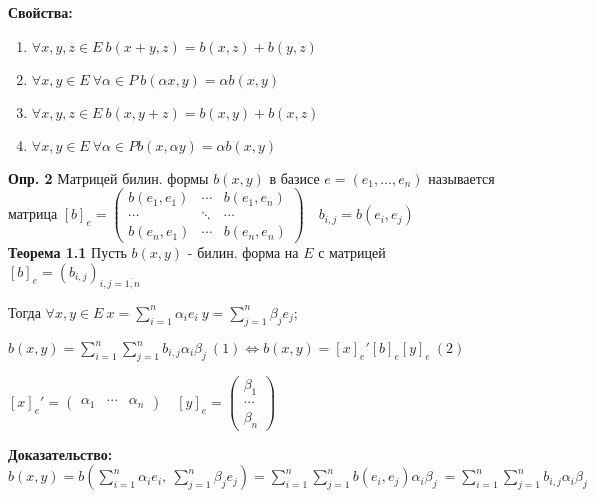 \textbf{Свойства:}
\begin{enumerate}
 \item $\forall x,y,z \in E\ b(x+y,z) = b(x,z) + b(y,z)$
 \item $\forall x,y \in E\ \forall \alpha \in P\ b(\alpha x,y) = \alpha b(x,y)$
 \item $\forall x,y,z \in E\ b(x,y+z) = b(x,y) + b(x,z)$
 \item $\forall x,y \in E\ \forall \alpha \in P b(x,\alpha y) = \alpha b(x,y)$
\end{enumerate}

\textbf{Опр. 2} Матрицей билин. формы $b(x,y)$ в базисе $e=(e_1,\ldots,e_n)$ называется матрица
 $[b]_e = \begin{pmatrix}
           b(e_1, e_1) & \cdots & b(e_1, e_n) \\
	   \cdots & \ddots & \cdots \\
	   b(e_n, e_1) & \cdots & b(e_n, e_n)
          \end{pmatrix}\quad b_{i,j} = b(e_i, e_j)$\\

\textbf{Теорема 1.1} Пусть $b(x,y)$ - билин. форма на $E$ с матрицей $[b]_e = (b_{i,j})_{i,j = \overline{1,n}}$

Тогда $\forall x,y \in E\ x = \sum\limits_{i=1}^n \alpha_i e_i\ y = \sum\limits_{j=1}^n \beta_j e_j;\ $

$b(x,y) = \sum\limits_{i=1}^n \sum\limits_{j=1}^n b_{i,j} \alpha_i \beta_j\ (1) \Leftrightarrow b(x,y) = [x]_e' [b]_e [y]_e\ (2)$

$[x]_e' = \begin{pmatrix} \alpha_1 & \cdots & \alpha_n \end{pmatrix}\quad [y]_e =\begin{pmatrix} \beta_1 \\ \cdots \\ \beta_n \end{pmatrix}\ $

\textbf{Доказательство:} $b(x,y) = b\left(\sum\limits_{i=1}^n \alpha_i e_i,\ \sum\limits_{j=1}^n \beta_j e_j\right) = \sum\limits_{i=1}^n \sum\limits_{j=1}^n b(e_i, e_j) \alpha_i \beta_j\ = \sum\limits_{i=1}^n \sum\limits_{j=1}^n b_{i,j} \alpha_i \beta_j\ $

